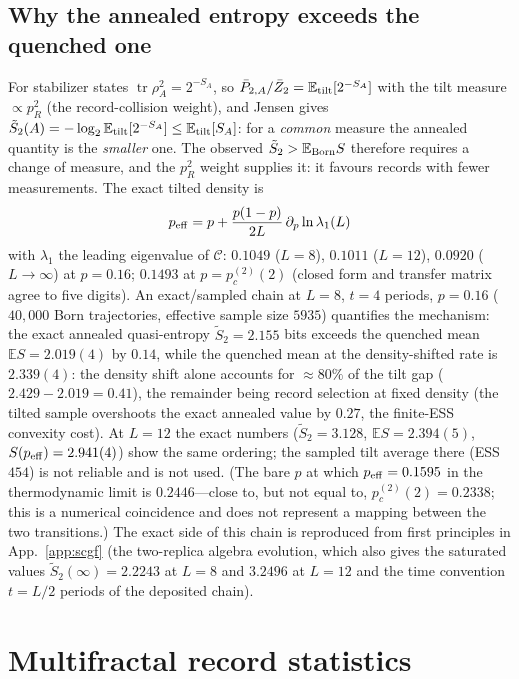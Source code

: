 \documentclass[11pt]{article}
\newcommand{\pctwo}{p_c^{(2)}}
\newcommand{\Ccomp}{\mathcal{C}}
\newcommand{\tr}{\operatorname{tr}}
\newcommand{\E}{\mathbb{E}}
\begin{document}
\subsection{Why the annealed entropy exceeds the quenched one}
\label{sec:tilt}
For stabilizer states $\tr\rho_A^2=2^{-S_A}$, so
$\bar P_{2,A}/\bar Z_2=\E_{\rm tilt}[2^{-S_A}]$ with the tilt measure
$\propto p_R^2$ (the record-collision weight), and Jensen gives
$\tilde S_2(A)=-\log_2\E_{\rm tilt}[2^{-S_A}]\le\E_{\rm tilt}[S_A]$: for a
\emph{common} measure the annealed quantity is the \emph{smaller} one.  The
observed $\tilde S_2>\E_{\rm Born}S$ therefore requires a change of measure,
and the $p_R^2$ weight supplies it: it favours records with fewer
measurements.  The exact tilted density is
\begin{equation}
  p_{\rm eff}=p+\frac{p(1-p)}{2L}\,\partial_p\ln\lambda_1(L)
  \label{eq:peff}
\end{equation}
with $\lambda_1$ the leading eigenvalue of $\Ccomp$: $0.1049$ ($L=8$),
$0.1011$ ($L=12$), $0.0920$ ($L\to\infty$) at $p=0.16$; $0.1493$ at
$p=\pctwo(2)$ (closed form and transfer matrix agree to five digits).  An
exact/sampled chain at $L=8$, $t=4$ periods, $p=0.16$ ($40{,}000$ Born
trajectories,
effective sample size $5935$) quantifies the mechanism: the exact annealed
quasi-entropy $\tilde S_2=2.155$ bits exceeds the quenched mean
$\E S=2.019(4)$ by $0.14$, while the quenched mean at the density-shifted
rate is $2.339(4)$: the density shift alone accounts for
${\approx}80\%$ of the tilt gap ($2.429-2.019=0.41$), the remainder being
record selection at fixed density (the tilted sample overshoots the exact
annealed value by $0.27$, the finite-ESS convexity cost).  At $L=12$ the
exact numbers ($\tilde S_2=3.128$, $\E S=2.394(5)$, $S(p_{\rm eff})=2.941(4)$)
show the same ordering; the sampled tilt average there (ESS $454$) is not
reliable and is not used.  (The bare $p$ at which $p_{\rm eff}=0.1595$ in the
thermodynamic limit is $0.2446$---close to, but not equal to,
$\pctwo(2)=0.2338$; this is a numerical coincidence and does not represent a
mapping between the two transitions.)  The exact side of this chain is
reproduced from first principles in App.~\ref{app:scgf} (the two-replica
algebra evolution, which also gives the saturated values
$\tilde S_2(\infty)=2.2243$ at $L=8$ and $3.2496$ at $L=12$ and the time
convention $t=L/2$ periods of the deposited chain).

\section{Multifractal record statistics}\label{sec:records}
\end{document}
